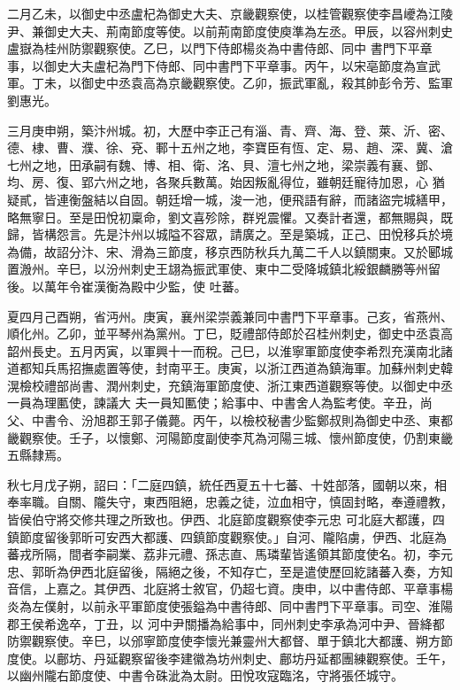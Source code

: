 \begin{pinyinscope}
 二月乙未，以御史中丞盧杞為御史大夫、京畿觀察使，以桂管觀察使李昌巙為江陵尹、兼御史大夫、荊南節度等使。以前荊南節度使庾準為左丞。甲辰，以容州刺史盧嶽為桂州防禦觀察使。乙巳，以門下侍郎楊炎為中書侍郎、同中
 書門下平章事，以御史大夫盧杞為門下侍郎、同中書門下平章事。丙午，以宋亳節度為宣武軍。丁未，以御史中丞袁高為京畿觀察使。乙卯，振武軍亂，殺其帥彭令芳、監軍劉惠光。



 三月庚申朔，築汴州城。初，大歷中李正己有淄、青、齊、海、登、萊、沂、密、德、棣、曹、濮、徐、兗、鄆十五州之地，李寶臣有恆、定、易、趙、深、冀、滄七州之地，田承嗣有魏、博、相、衛、洺、貝、澶七州之地，梁崇義有襄、鄧、均、房、復、郢六州之地，各聚兵數萬。始因叛亂得位，雖朝廷寵待加恩，心
 猶疑貳，皆連衡盤結以自固。朝廷增一城，浚一池，便飛語有辭，而諸盜完城繕甲，略無寧日。至是田悅初稟命，劉文喜殄除，群兇震懼。又奏計者還，都無賜與，既歸，皆構怨言。先是汴州以城隘不容眾，請廣之。至是築城，正己、田悅移兵於境為備，故詔分汴、宋、滑為三節度，移京西防秋兵九萬二千人以鎮關東。又於郾城置溵州。辛巳，以汾州刺史王翃為振武軍使、東中二受降城鎮北綏銀麟勝等州留後。以萬年令崔漢衡為殿中少監，使
 吐蕃。



 夏四月己酉朔，省沔州。庚寅，襄州梁崇義兼同中書門下平章事。己亥，省燕州、順化州。乙卯，並平琴州為黨州。丁巳，貶禮部侍郎於召桂州刺史，御史中丞袁高韶州長史。五月丙寅，以軍興十一而稅。己巳，以淮寧軍節度使李希烈充漢南北諸道都知兵馬招撫處置等使，封南平王。庚寅，以浙江西道為鎮海軍。加蘇州刺史韓滉檢校禮部尚書、潤州刺史，充鎮海軍節度使、浙江東西道觀察等使。以御史中丞一員為理匭使，諫議大
 夫一員知匭使；給事中、中書舍人為監考使。辛丑，尚父、中書令、汾旭郡王郭子儀薨。丙午，以檢校秘書少監鄭叔則為御史中丞、東都畿觀察使。壬子，以懷鄭、河陽節度副使李芃為河陽三城、懷州節度使，仍割東畿五縣隸焉。



 秋七月戊子朔，詔曰：「二庭四鎮，統任西夏五十七蕃、十姓部落，國朝以來，相奉率職。自關、隴失守，東西阻絕，忠義之徒，泣血相守，慎固封略，奉遵禮教，皆侯伯守將交修共理之所致也。伊西、北庭節度觀察使李元忠
 可北庭大都護，四鎮節度留後郭昕可安西大都護、四鎮節度觀察使。」自河、隴陷虜，伊西、北庭為蕃戎所隔，間者李嗣業、荔非元禮、孫志直、馬璘輩皆遙領其節度使名。初，李元忠、郭昕為伊西北庭留後，隔絕之後，不知存亡，至是遣使歷回紇諸蕃入奏，方知音信，上嘉之。其伊西、北庭將士敘官，仍超七資。庚申，以中書侍郎、平章事楊炎為左僕射，以前永平軍節度使張鎰為中書待郎、同中書門下平章事。司空、淮陽郡王侯希逸卒，丁丑，以
 河中尹關播為給事中，同州刺史李承為河中尹、晉絳都防禦觀察使。辛巳，以邠寧節度使李懷光兼靈州大都督、單于鎮北大都護、朔方節度使。以鄜坊、丹延觀察留後李建徽為坊州刺史、鄜坊丹延都團練觀察使。壬午，以幽州隴右節度使、中書令硃泚為太尉。田悅攻寇臨洺，守將張伾城守。




\end{pinyinscope}
